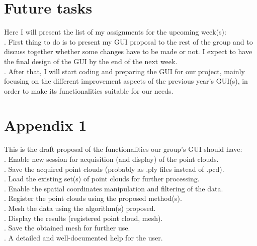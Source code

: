\documentclass[aps,letterpaper,11pt]{revtex4}
\begin{document}
\section {Future tasks}
Here I will present the list of my assignments for the upcoming week(s):\\
. First thing to do is to present my GUI proposal to the rest of the group and to discuss together whether some changes have to be made or not. I expect to have the final design of the GUI by the end of the next week.\\
. After that, I will start coding and preparing the GUI for our project, mainly focusing on the different improvement aspects of the previous year's GUI(s), in order to make its functionalities  suitable for our needs.\\

\section {Appendix 1}
This is the draft proposal of the functionalities our group's GUI should have:\\
. Enable new session for acquisition (and display) of the point clouds.\\
. Save the acquired point clouds (probably as .ply files instead of .pcd).\\
. Load the existing set(s) of point clouds for further processing.\\
. Enable the spatial coordinates manipulation and filtering of the data.\\
. Register the point clouds using the proposed method(s).\\
. Mesh the data using the algorithm(s) proposed.\\
. Display the results (registered point cloud, mesh).\\
. Save the obtained mesh for further use.\\
. A detailed and well-documented help for the user.\\
 
\end{document}
